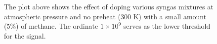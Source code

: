 \begin{figure}

\centering



\caption[Syngas-alkane flames - I]{The plot above shows the effect of doping various syngas mixtures at atmospheric pressure and no preheat (300 K) with a small amount (5\%) of methane. The ordinate \(1\times10^9\) serves as the lower threshold for the signal.}

\label{fig:syngas-300}

\end{figure}
